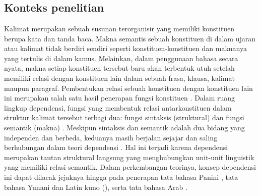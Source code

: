 \chapter{\babDua}

\section{Konteks penelitian}
Kalimat merupakan sebuah susunan terorganisir yang memiliki konstituen berupa kata dan tanda baca. Makna semantis sebuah konstituen di dalam ujaran atau kalimat tidak berdiri sendiri seperti konstituen-konstituen dan maknanya yang tertulis di dalam kamus. Melainkan, dalam penggunaan bahasa secara nyata, makna setiap konstituen tersebut baru akan terbentuk utuh setelah memiliki relasi dengan konstituen lain dalam sebuah frasa, klausa, kalimat maupun paragraf. Pembentukan relasi sebuah konstituen dengan konstituen lain ini merupakan salah satu hasil penerapan fungsi konstituen \citep{tesniere1959elements}. Dalam ruang lingkup dependensi, fungsi yang membentuk relasi antarkonstituen dalam struktur kalimat tersebut terbagi dua: fungsi sintaksis (struktural) dan fungsi semantik (makna) \citep{tesniere1959elements}. Meskipun sintaksis dan semantik adalah dua bidang yang independen dan berbeda, keduanya masih berjalan sejajar dan saling berhubungan dalam teori dependensi \citep{tesniere1959elements}. Hal ini terjadi karena dependensi merupakan tautan struktural langsung yang menghubungkan unit-unit linguistik yang memiliki relasi semantik. Dalam perkembangan teorinya, konsep dependensi ini dapat dilacak jejaknya hingga pada penerapan tata bahasa Panini \citep{bharati1995natural}, tata bahasa Yunani dan Latin kuno (\citealp{covington1984syntactic, percival1990reflections}), serta tata bahasa Arab \citep{owens1988foundations}. 

